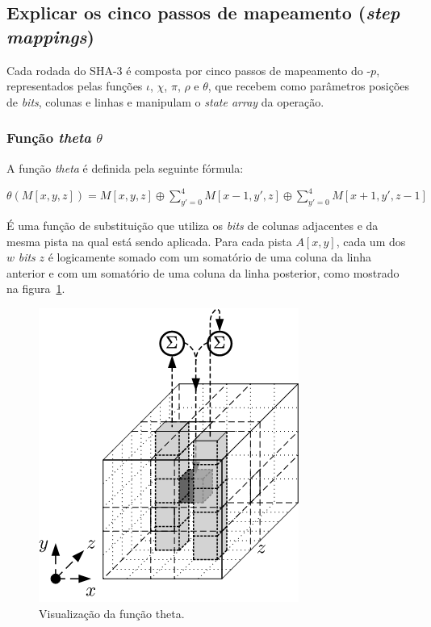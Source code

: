 \subsection{Explicar os cinco passos de mapeamento (\textit{step mappings})}

Cada rodada do SHA-3 é composta por cinco passos de mapeamento do \Keccak-$p$,
representados pelas funções $\iota$, $\chi$, $\pi$, $\rho$ e $\theta$, que
recebem como parâmetros posições de \textit{bits}, colunas e linhas e manipulam
o \textit{state array} da operação.

\subsubsection{Função \textit{theta} $\theta$}

A função \textit{theta} é definida pela seguinte fórmula:

$\theta(M[x, y, z]) = M[x, y, z] \oplus \sum\limits_{y'=0}^{4}M[x-1, y', z] \oplus \sum\limits_{y'=0}^{4}M[x+1, y', z-1]$

É uma função de substituição que utiliza os \textit{bits} de colunas adjacentes
e da mesma pista na qual está sendo aplicada. Para cada pista $A[x, y]$, cada
um dos $w$ \textit{bits} $z$ é logicamente somado com um somatório de uma
coluna da linha anterior e com um somatório de uma coluna da linha posterior,
como mostrado na figura~\ref{fig:theta}.

\begin{figure}[ht]
    \centering
    \includegraphics{images/theta.png}
    \caption{Visualização da função theta.}
    \label{fig:theta}
\end{figure}

